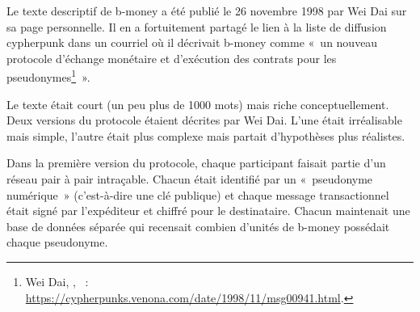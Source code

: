Le texte descriptif de b-money a été publié le 26 novembre 1998 par Wei Dai sur sa page personnelle. Il en a fortuitement partagé le lien à la liste de diffusion cypherpunk dans un courriel où il décrivait b-money comme «~un nouveau protocole d'échange monétaire et d'exécution des contrats pour les pseudonymes\footnote{Wei Dai, , ~: \url{https://cypherpunks.venona.com/date/1998/11/msg00941.html}.}~». %

Le texte était court (un peu plus de 1000 mots) mais riche conceptuellement. Deux versions du protocole étaient décrites par Wei Dai. L'une était irréalisable mais simple, l'autre était plus complexe mais partait d'hypothèses plus réalistes.

Dans la première version du protocole, chaque participant faisait partie d'un réseau pair à pair intraçable. Chacun était identifié par un «~pseudonyme numérique~» (c'est-à-dire une clé publique) et chaque message transactionnel était signé par l'expéditeur et chiffré pour le destinataire. Chacun maintenait une base de données séparée qui recensait combien d'unités de b-money possédait chaque pseudonyme.

